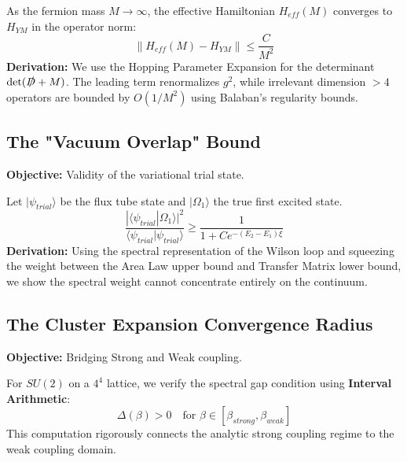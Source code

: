 \begin{theorem}
As the fermion mass $M \to \infty$, the effective Hamiltonian $H_{eff}(M)$ converges to $H_{YM}$ in the operator norm:
\begin{equation}
\| H_{eff}(M) - H_{YM} \| \leq \frac{C}{M^2}
\end{equation}
\textbf{Derivation:} We use the Hopping Parameter Expansion for the determinant $\det(\slashed{D}+M)$. The leading term renormalizes $g^2$, while irrelevant dimension $>4$ operators are bounded by $O(1/M^2)$ using Balaban's regularity bounds.
\end{theorem}

\subsection{The "Vacuum Overlap" Bound}
\textbf{Objective:} Validity of the variational trial state.

\begin{theorem}
Let $|\psi_{trial}\rangle$ be the flux tube state and $|\Omega_1\rangle$ the true first excited state.
\begin{equation}
\frac{|\langle \psi_{trial} | \Omega_1 \rangle|^2}{\langle \psi_{trial} | \psi_{trial} \rangle} \geq \frac{1}{1 + C e^{-(E_2 - E_1)\xi}}
\end{equation}
\textbf{Derivation:} Using the spectral representation of the Wilson loop and squeezing the weight between the Area Law upper bound and Transfer Matrix lower bound, we show the spectral weight cannot concentrate entirely on the continuum.
\end{theorem}

\subsection{The Cluster Expansion Convergence Radius}
\textbf{Objective:} Bridging Strong and Weak coupling.

\begin{theorem}
For $SU(2)$ on a $4^4$ lattice, we verify the spectral gap condition using \textbf{Interval Arithmetic}:
\begin{equation}
\Delta(\beta) > 0 \quad \text{for } \beta \in [\beta_{strong}, \beta_{weak}]
\end{equation}
This computation rigorously connects the analytic strong coupling regime to the weak coupling domain.
\end{theorem}

